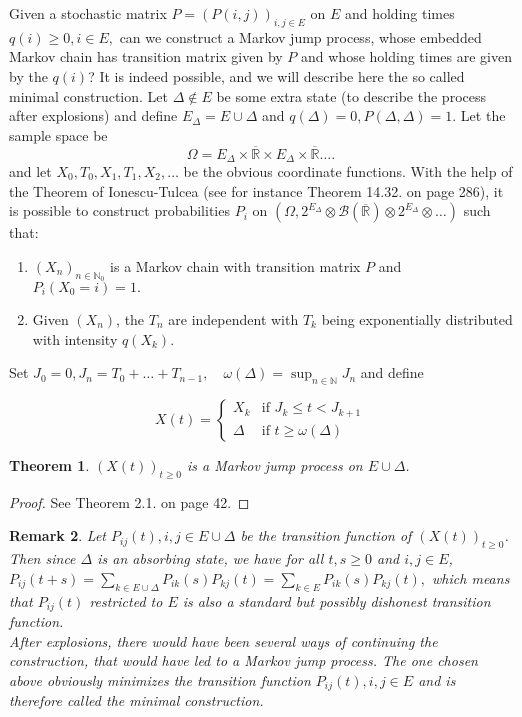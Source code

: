 \documentclass[12pt,a4paper]{scrartcl}
\newtheorem{theorem}{Theorem}[section]
\newtheorem {remark}[theorem]{Remark}
\numberwithin{equation}{section}
\newcommand{\R}{\mathbb{R}} %
\newcommand{\N}{\mathbb{N}} %
\begin{document}
Given a stochastic matrix $P = \left(P\left(i,j\right)\right)_{i,j \in E}$ on $E$ and holding times $q\left(i\right) \geq 0,  i \in E,$ can we construct a Markov jump process, whose embedded Markov chain has transition matrix given by $P$ and whose holding times are given by the $q\left(i\right)$?
It is indeed possible, and we will describe here the so called minimal construction. Let $ \Delta \notin E$ be some extra state (to describe the process after explosions) and define $E_{\Delta} = E \cup \Delta$ and $q\left(\Delta\right) = 0, P\left(\Delta,\Delta\right) = 1.$  Let the sample space be
$$\Omega = E_{\Delta} \times \overline{\R} \times E_{\Delta} \times \overline{\R} \ldots. $$ and let $ X_0, T_0, X_1, T_1,X_2,\ldots $ be the obvious coordinate functions. With the help of the Theorem of Ionescu-Tulcea (see for instance \cite{klenke} Theorem 14.32. on page 286), it is possible to construct probabilities $P_i$ on $\left(\Omega, 2^{E_{\Delta}} \otimes \mathcal{B}\left( \overline{\R}\right) \otimes 2^{E_{\Delta}} \otimes \ldots\right)$ such that:

\begin{enumerate}
\item $\left(X_n\right)_{n \in \N_0}$ is a Markov chain with transition matrix $P$ and $P_{i}\left(X_0= i\right) = 1.$
\item Given $\left(X_n\right)$, the $T_n$ are independent with $T_k$ being exponentially distributed with intensity $q\left(X_k\right).$
\end{enumerate}

Set $J_0 = 0, J_n = T_0 + \ldots + T_{n-1}, \quad \omega\left(\Delta\right) = \sup_{n \in \N} J_n$ and define

$$ X\left(t\right) =\begin{cases} X_k & \mbox{if } J_k \leq t < J_{k+1} \\ \Delta & \mbox{if } t\geq \omega\left(\Delta\right) \end{cases}$$

\begin{theorem}
$\left(X\left(t\right)\right)_{t\geq 0}$ is a Markov jump process on $ E \cup \Delta $.
\end{theorem}
\begin{proof}
See \cite{asmussen} Theorem 2.1. on page 42.
\end{proof}

\begin{remark}
Let $P_{ij}\left(t\right), i,j \in E \cup \Delta$ be the transition function of $\left(X\left(t\right)\right)_{t\geq 0}$. Then since $\Delta$ is an absorbing state, we have for all $t,s \geq 0$ and $i,j \in E$, $P_{ij}\left(t+s\right) = \sum_{k \in E \cup \Delta} P_{ik}\left(s\right) P_{kj}\left(t\right) = \sum_{k \in E} P_{ik}\left(s\right) P_{kj}\left(t\right),$ which means that $P_{ij}\left(t\right)$ restricted to $E$ is also a standard but possibly dishonest transition function.\\
After explosions, there would have been several ways of continuing the construction, that would have led to a Markov jump process. The one chosen above obviously minimizes the transition function $P_{ij}\left(t\right), i,j \in E$ and is therefore called the minimal construction.
\end{remark}
\end{document}
